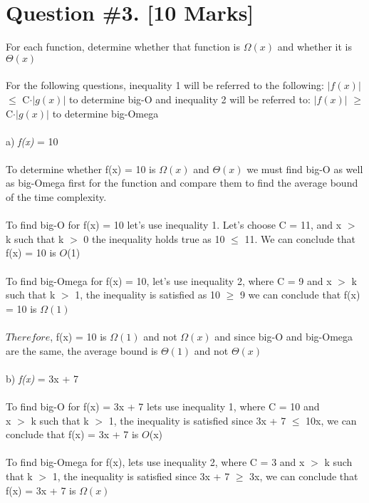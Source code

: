 \documentclass{article}
\begin{document}
\section{Question \#3. [10 Marks]}
For each function, determine whether that function is $\Omega(x)$ and whether it is $\Theta(x)$\\ \\
For the following questions, inequality 1 will be referred to the following: $\left| f(x) \right|$ $\leq$ C$\cdot$$\left| g(x) \right|$ to determine big-O and inequality 2 will be referred to: $\left| f(x) \right|$ $\geq$ C$\cdot$$\left| g(x) \right|$ to determine big-Omega \\ \\
a) \textit{f(x)} = 10 \\ \\ 
To determine whether f(x) = 10 is  $\Omega(x)$ and $\Theta(x)$ we must find big-O as well as big-Omega first for the function and compare them to find the average bound of the time complexity.  \\ \\  
To find big-O for f(x) = 10 let's use inequality 1. Let's choose C = 11, and x $>$ k such that k $>$ 0  the inequality holds true as 10 $\leq$ 11. We can conclude that f(x) = 10 is $O$(1)\\ \\ 
To find big-Omega for f(x) = 10, let's use inequality 2, where C = 9 and x $>$ k such that k $>$ 1, the inequality is satisfied as 10 $\geq$ 9 we can conclude that f(x) = 10 is $\Omega(1)$ \\ \\ 
$Therefore$, f(x) = 10 is  $\Omega{(1)}$ and not $\Omega{(x)}$ and since big-O and big-Omega are the same, the average bound is $\Theta{(1)}$ and not $\Theta{(x)}$
\\ \\ 
b) \textit{f(x)} = 3x + 7 \\ \\ 
To find big-O for f(x) = 3x + 7 lets use inequality 1, where C = 10 and \\ x $>$ k such that k $>$ 1, the inequality is  satisfied since 3x + 7 $\leq$ 10x, we can conclude that f(x) = 3x + 7 is $O$(x) \\\\ 
To find big-Omega for f(x), lets use inequality 2, where C = 3 and x $>$ k such that k $>$ 1, the inequality is satisfied since 3x + 7 $\geq$ 3x, we can conclude that f(x) = 3x + 7 is $\Omega(x)$ \\ \\ 
\end{document}

